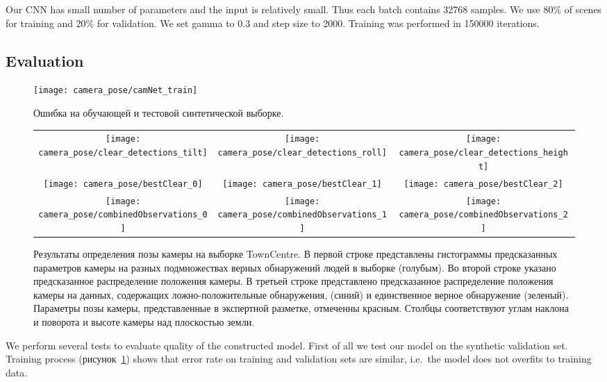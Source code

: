 Our CNN has small number of parameters and the input is relatively small. Thus each batch contains 32768 samples. We use 80\% of scenes for training and 20\% for validation. We set gamma to $0.3$ and step size to 2000. Training was performed in 150000 iterations.

\subsection{Evaluation}

\begin{figure}[ht]
	\centering
	\texttt{[image: camera\_pose/camNet\_train]}
	\caption{Ошибка на обучающей и тестовой синтетической выборке.}
	\label{fig:training}
\end{figure}

\begin{figure*}[ht]
	\centering
	\begin{tabular}{ccc}
		\texttt{[image: camera\_pose/clear\_detections\_tilt]} &
		\texttt{[image: camera\_pose/clear\_detections\_roll]} &
		\texttt{[image: camera\_pose/clear\_detections\_height]} \\
		\texttt{[image: camera\_pose/bestClear\_0]} &
		\texttt{[image: camera\_pose/bestClear\_1]} &
		\texttt{[image: camera\_pose/bestClear\_2]} \\
		\texttt{[image: camera\_pose/combinedObservations\_0]} &
		\texttt{[image: camera\_pose/combinedObservations\_1]} &
		\texttt{[image: camera\_pose/combinedObservations\_2]} \\
	\end{tabular}
	\caption{Результаты определения позы камеры на выборке TownCentre. В первой строке представлены гистограммы предсказанных параметров камеры на разных подмножествах верных обнаружений людей в выборке (голубым). Во второй строке указано предсказанное распределение положения камеры. В третьей строке представлено предсказанное распределение положения камеры на данных, содержащих ложно-положительные обнаружения, (синий) и единственное верное обнаружение (зеленый). Параметры позы камеры, представленные в экспертной разметке, отмеченны красным. Столбцы соответствуют углам наклона и поворота и высоте камеры над плоскостью земли.}
	\label{fig:bestClear}
\end{figure*}

We perform several tests to evaluate quality of the constructed model. First of all we test our model on the synthetic validation set. Training process (рисунок~\ref{fig:training}) shows that error rate on training and validation sets are similar, i.e.\ the model does not overfits to training data.

